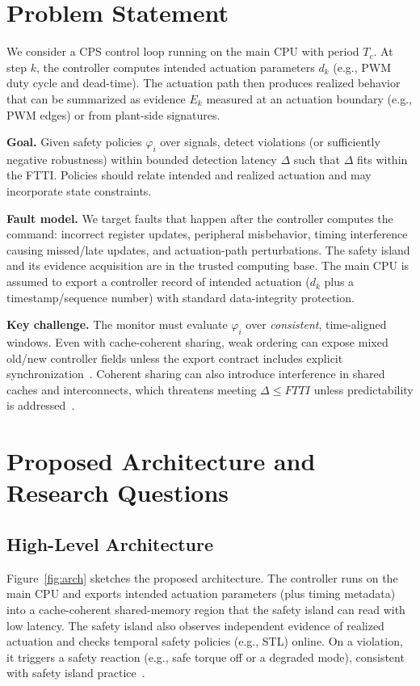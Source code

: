 \documentclass[letterpaper,twocolumn,10pt]{article}
\newcommand{\SafetyIsland}{safety island\xspace}
\newcommand{\STL}{STL\xspace}
\newcommand{\FTTI}{FTTI\xspace}
\newcommand{\PrimaryCompute}{main CPU\xspace}
\begin{document}
\section{Problem Statement}
We consider a CPS control loop running on the \PrimaryCompute with period $T_c$. At step $k$, the controller computes intended actuation parameters $d_k$ (e.g., PWM duty cycle and dead-time). The actuation path then produces realized behavior that can be summarized as evidence $E_k$ measured at an actuation boundary (e.g., PWM edges) or from plant-side signatures.

\textbf{Goal.} Given safety policies $\varphi_i$ over signals, detect violations (or sufficiently negative robustness) within bounded detection latency $\Delta$ such that $\Delta$ fits within the \FTTI. Policies should relate intended and realized actuation and may incorporate state constraints.

\textbf{Fault model.} We target faults that happen after the controller computes the command: incorrect register updates, peripheral misbehavior, timing interference causing missed/late updates, and actuation-path perturbations. The \SafetyIsland and its evidence acquisition are in the trusted computing base. The \PrimaryCompute is assumed to export a controller record of intended actuation ($d_k$ plus a timestamp/sequence number) with standard data-integrity protection.

\textbf{Key challenge.} The monitor must evaluate $\varphi_i$ over \emph{consistent}, time-aligned windows. Even with cache-coherent sharing, weak ordering can expose mixed old/new controller fields unless the export contract includes explicit synchronization~\cite{Pulte2018SimplifyingARM}. Coherent sharing can also introduce interference in shared caches and interconnects, which threatens meeting $\Delta \le \FTTI$ unless predictability is addressed~\cite{Hassan2017PredictableCoherence,Hassan2022IntegratingCOTSCoherence}.

\section{Proposed Architecture and Research Questions}
\subsection{High-Level Architecture}
Figure~\ref{fig:arch} sketches the proposed architecture. The controller runs on the \PrimaryCompute and exports intended actuation parameters (plus timing metadata) into a cache-coherent shared-memory region that the \SafetyIsland can read with low latency. The \SafetyIsland also observes independent evidence of realized actuation and checks temporal safety policies (e.g., \STL) online. On a violation, it triggers a safety reaction (e.g., safe torque off or a degraded mode), consistent with safety island practice~\cite{NVIDIADriveFSI,ArmAutoSolutionsOverview}.
\end{document}
